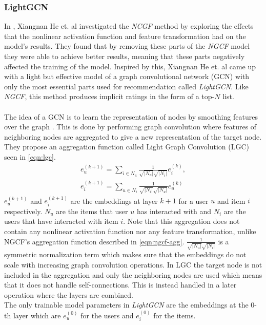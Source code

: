 \subsubsection{LightGCN}
In \cite{LightGCN}, Xiangnan He et. al investigated the \textit{NCGF} method by exploring the effects that the nonlinear activation function and feature transformation had on the model's results.
They found that by removing these parts of the \textit{NGCF} model they were able to achieve better results, meaning that these parts negatively affected the training of the model.
Inspired by this, Xiangnan He et. al came up with a light but effective model of a graph convolutional network (GCN) with only the most essential parts used for recommendation called \textit{LightGCN}.
Like \textit{NGCF}, this method produces implicit ratings in the form of a top-$N$ list.
\\\\
The idea of a GCN is to learn the representation of nodes by smoothing features over the graph \cite{LightGCN}.
This is done by performing graph convolution where features of neighboring nodes are aggregated to give a new representation of the target node.
They propose an aggregation function called Light Graph Convolution (LGC) seen in \autoref{eqn:lgc}.
\begin{align}\label{eqn:lgc}
    e_{u}^{(k+1)}=\sum_{i\in N_u}\frac{1}{\sqrt{\left | N_u \right |}\sqrt{\left | N_i \right |}}e_{i}^{(k)},\nonumber\\
    e_{i}^{(k+1)}=\sum_{u\in N_i}\frac{1}{\sqrt{\left | N_i \right |}\sqrt{\left | N_u \right |}}e_{u}^{(k)}
\end{align}
$e_{u}^{(k+1)}$ and $e_{i}^{(k+1)}$ are the embeddings at layer $k+1$ for a user $u$ and item $i$ respectively.
$N_u$ are the items that user $u$ has interacted with and $N_i$ are the users that have interacted with item $i$.
Note that this aggregation does not contain any nonlinear activation function nor any feature transformation, unlike NGCF's aggregation function described in \autoref{eqn:ngcf-agg}.
$\frac{1}{\sqrt{\left | N_u \right |}\sqrt{\left | N_i \right |}}$ is a symmetric normalization term which makes sure that the embeddings do not scale with increasing graph convolution operations.
In LGC the target node is not included in the aggregation and only the neighboring nodes are used which means that it does not handle self-connections.
This is instead handled in a later operation where the layers are combined.
\\
The only trainable model parameters in \textit{LightGCN} are the embeddings at the 0-th layer which are $e_{u}^{(0)}$ for the users and $e_{i}^{(0)}$ for the items.
